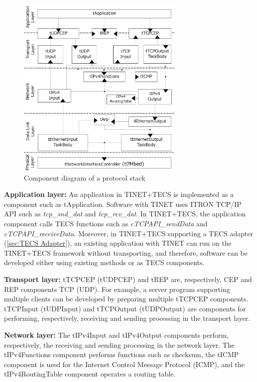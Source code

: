 \documentclass[conference]{IEEEtran/IEEEtran}
\begin{document}
\begin{figure}[t]
    \centering
    \includegraphics[width=8.0cm,clip]{figure/ComponentProtocolStack.pdf}
    \vspace{-1mm} \caption{Component diagram of a protocol stack}
    \vspace{-1mm} \label{fig:ComponentProtocolStack}
\end{figure}


{\bf Application layer:}
An application in TINET+TECS is implemented as a component such as tApplication.
Software with TINET uses ITRON TCP/IP API \cite{url:ITRON_TCP/IP_API_Spec} such as {\it tcp\_snd\_dat} and {\it tcp\_rcv\_dat}.
In TINET+TECS, the application component calls TECS functions such as {\it cTCPAPI\_sendData} and {\it cTCPAPI\_receiveData}.
Moreover, in TINET+TECS supporting a TECS adapter (\ref{sec:TECS Adapter}), an existing application with TINET can run on the TINET+TECS framework without transporting, and therefore, software can be developed either using existing methods or as TECS components.

{\bf Transport layer:}
tTCPCEP (tUDPCEP) and tREP are, respectively, CEP and REP components TCP (UDP).
For example, a server program supporting multiple clients can be developed by preparing multiple tTCPCEP components.
tTCPInput (tUDPInput) and tTCPOutput (tUDPOutput) are components for performing, respectively, receiving and sending processing in the transport layer.

{\bf Network layer:}
The tIPv4Input and tIPv4Output components perform, respectively, the receiving and sending processing in the network layer.
The tIPv4Functions component performs functions such as checksum, the tICMP component is used for the Internet Control Message Protocol (ICMP), and the tIPv4RoutingTable component operates a routing table.
\end{document}
